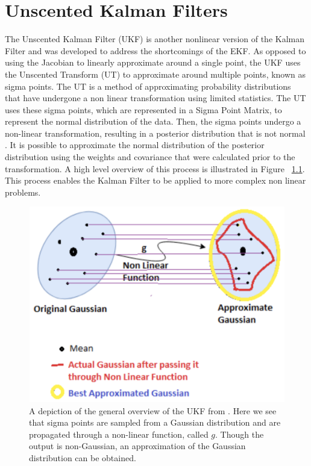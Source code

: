 \chapter{Unscented Kalman Filters}
\label{Unscented Kalman Filters}

The Unscented Kalman Filter (UKF) is another nonlinear version of the Kalman Filter and was developed to address the shortcomings of the EKF. As opposed to using the Jacobian to linearly approximate around a single point, the UKF uses the Unscented Transform (UT) to approximate around multiple points, known as sigma points. The UT is a method of approximating probability distributions that have undergone a non linear transformation using limited statistics. The UT uses these sigma points, which are represented in a Sigma Point Matrix, to represent the normal distribution of the data. Then, the sigma points undergo a non-linear transformation, resulting in a posterior distribution that is not normal \cite{inbook, Wan01theunscented}. It is possible to approximate the normal distribution of the posterior distribution using the weights and covariance that were calculated prior to the transformation. A high level overview of this process is illustrated in Figure ~\ref{fig:UKF}. This process enables the Kalman Filter to be applied to more complex non linear problems. 

\begin{figure}[ht]
    \centering
    \includegraphics[scale = 0.35]{UKF.png}
    \caption{A depiction of the general overview of the UKF from \cite{chadha_2019}. Here we see that sigma points are sampled from a Gaussian distribution and are propagated through a non-linear function, called $g$. Though the output is non-Gaussian, an approximation of the Gaussian distribution can be obtained.}
    \label{fig:UKF}
\end{figure}


